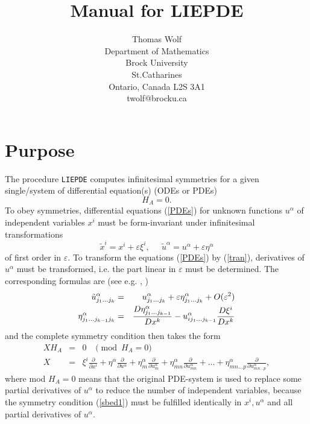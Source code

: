 \documentclass[12pt]{article}
\title{Manual for LIEPDE}
\author{Thomas Wolf \\                        
        Department of Mathematics \\
        Brock University \\
        St.Catharines \\
        Ontario, Canada L2S 3A1 \\
        twolf@brocku.ca}
\begin{document}
\maketitle
\section{Purpose}
The procedure {\tt LIEPDE} computes infinitesimal symmetries
for a given single/system of differential equation(s) (ODEs or PDEs)
\begin{equation}
H_A = 0.              \label{PDEs}
\end{equation}
To obey symmetries, differential equations (\ref{PDEs})
for unknown functions $u^\alpha$ of independent variables $x^i$
must be form-invariant under infinitesimal transformations
\begin{equation}
\tilde{x}^i = x^i + \varepsilon \xi^i, \;\; \;\;\;
        \tilde{u}^\alpha = u^\alpha + \varepsilon \eta^\alpha  \label{tran}
\end{equation}
of first order in $\varepsilon.$ To transform the equations (\ref{PDEs})
by (\ref{tran}), derivatives of $u^\alpha$ must be transformed, i.e. the part 
linear in $\varepsilon$ must be determined. The corresponding formulas are 
(see e.g. \cite{Olv}, \cite{Step})
\begin{eqnarray}
\tilde{u}^\alpha_{j_1\ldots j_k} & = &
u^\alpha_{j_1\ldots j_k} + \varepsilon
\eta^\alpha_{j_1\ldots j_k} + O(\varepsilon^2)  \nonumber \\ \vspace{3mm}
\eta^\alpha_{j_1\ldots j_{k-1}j_k} & = &
  \frac{D \eta^\alpha_{j_1\ldots j_{k-1}}}{D x^k} - 
  u^\alpha_{ij_1\ldots j_{k-1}}\frac{D \xi^i}{D x^k} \label{recur}
\end{eqnarray}
and the complete symmetry condition then takes the form
\begin{eqnarray}
X H_A & = & 0 \;\; \;\pmod{ H_A = 0}  \label{sbed1} \\
X & = & \xi^i \frac{\partial}{\partial x^i} +
 \eta^\alpha \frac{\partial}{\partial u^\alpha} +
 \eta^\alpha_m \frac{\partial}{\partial u^\alpha_m} +
 \eta^\alpha_{mn} \frac{\partial}{\partial u^\alpha_{mn}} + \ldots +
 \eta^\alpha_{mn\ldots p} \frac{\partial}{\partial u^\alpha_{mn\ldots p}} ,
\label{sbed2}
\end{eqnarray}
where mod $H_A = 0$ means that the original PDE-system is used to replace
some partial derivatives of $u^\alpha$ to reduce the number of independent
variables, because the symmetry condition (\ref{sbed1}) must be 
fulfilled identically in $x^i, u^\alpha$ and all partial
derivatives of $u^\alpha.$
\end{document}
